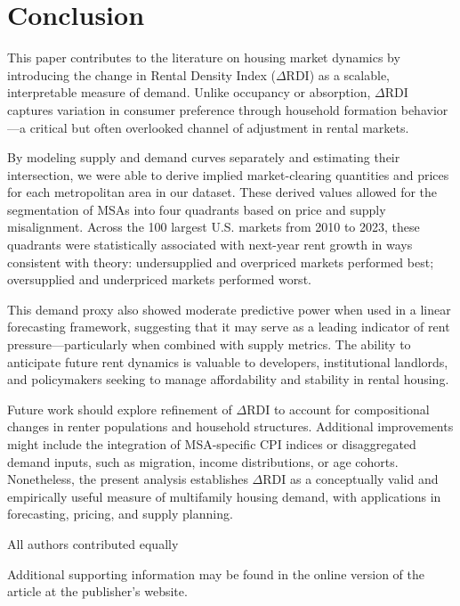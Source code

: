 \documentclass[APA,Times1COL]{WileyNJDv5} %
\begin{document}
\section{Conclusion}

This paper contributes to the literature on housing market dynamics by introducing the change in Rental Density Index (\(\Delta\text{RDI}\)) as a scalable, interpretable measure of demand. Unlike occupancy or absorption, \(\Delta\text{RDI}\) captures variation in consumer preference through household formation behavior---a critical but often overlooked channel of adjustment in rental markets.

By modeling supply and demand curves separately and estimating their intersection, we were able to derive implied market-clearing quantities and prices for each metropolitan area in our dataset. These derived values allowed for the segmentation of MSAs into four quadrants based on price and supply misalignment. Across the 100 largest U.S. markets from 2010 to 2023, these quadrants were statistically associated with next-year rent growth in ways consistent with theory: undersupplied and overpriced markets performed best; oversupplied and underpriced markets performed worst.

This demand proxy also showed moderate predictive power when used in a linear forecasting framework, suggesting that it may serve as a leading indicator of rent pressure---particularly when combined with supply metrics. The ability to anticipate future rent dynamics is valuable to developers, institutional landlords, and policymakers seeking to manage affordability and stability in rental housing.

Future work should explore refinement of \(\Delta\text{RDI}\) to account for compositional changes in renter populations and household structures. Additional improvements might include the integration of MSA-specific CPI indices or disaggregated demand inputs, such as migration, income distributions, or age cohorts. Nonetheless, the present analysis establishes \(\Delta\text{RDI}\) as a conceptually valid and empirically useful measure of multifamily housing demand, with applications in forecasting, pricing, and supply planning.


{}

All authors contributed equally










Additional supporting information may be found in the
online version of the article at the publisher’s website.










\nocite{*}%
\end{document}
